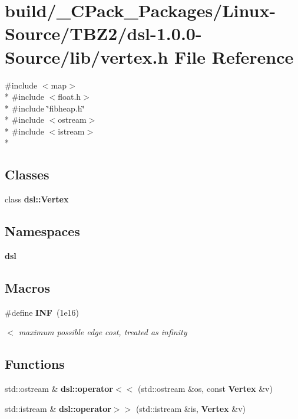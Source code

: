 \section{build/\-\_\-\-C\-Pack\-\_\-\-Packages/\-Linux-\/\-Source/\-T\-B\-Z2/dsl-\/1.0.0-\/\-Source/lib/vertex.h File Reference}
\label{build_2__CPack__Packages_2Linux-Source_2TBZ2_2dsl-1_80_80-Source_2lib_2vertex_8h}
{\ttfamily \#include $<$map$>$}\\*
{\ttfamily \#include $<$float.\-h$>$}\\*
{\ttfamily \#include \char`\"{}fibheap.\-h\char`\"{}}\\*
{\ttfamily \#include $<$ostream$>$}\\*
{\ttfamily \#include $<$istream$>$}\\*
\subsection*{Classes}
\begin{DoxyCompactItemize}
\item 
class {\bf dsl\-::\-Vertex}
\end{DoxyCompactItemize}
\subsection*{Namespaces}
\begin{DoxyCompactItemize}
\item 
{\bf dsl}
\end{DoxyCompactItemize}
\subsection*{Macros}
\begin{DoxyCompactItemize}
\item 
\#define {\bf I\-N\-F}~(1e16)
\begin{DoxyCompactList}\small\item\em $<$ maximum possible edge cost, treated as infinity \end{DoxyCompactList}\end{DoxyCompactItemize}
\subsection*{Functions}
\begin{DoxyCompactItemize}
\item 
std\-::ostream \& {\bf dsl\-::operator$<$$<$} (std\-::ostream \&os, const {\bf Vertex} \&v)
\item 
std\-::istream \& {\bf dsl\-::operator$>$$>$} (std\-::istream \&is, {\bf Vertex} \&v)
\end{DoxyCompactItemize}



